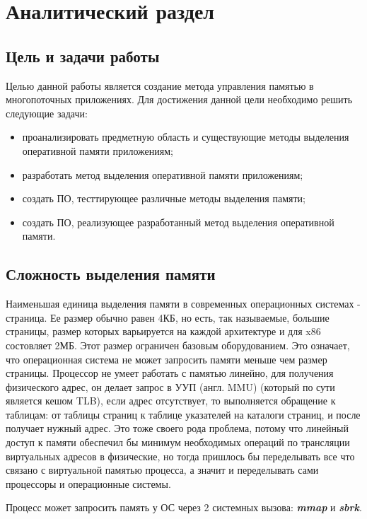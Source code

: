 \chapter{Аналитический раздел}
\label{cha:analysis}
\section{Цель и задачи работы}
Целью данной работы является создание метода управления памятью в многопоточных приложениях.
Для достижения данной цели необходимо решить следующие задачи:
\begin{itemize}
	\item проанализировать предметную область и существующие методы выделения оперативной памяти приложениям;
	\item разработать метод выделения оперативной памяти приложениям;
	\item создать ПО, тесттирующее различные методы выделения памяти;
	\item создать ПО, реализующее  разработанный метод выделения оперативной памяти.
\end{itemize}

\section{Сложность выделения памяти}

Наименьшая единица выделения памяти в современных операционных системах - страница. Ее размер обычно равен 4КБ, но есть, так называемые, большие   страницы, размер которых варьируется на каждой архитектуре и для x86 состовляет 2МБ. Этот размер ограничен базовым оборудованием. Это означает, что операционная   система не может запросить памяти меньше чем размер страницы. Процессор не умеет работать с памятью   линейно, для получения физического адрес, он делает запрос в УУП (англ. MMU)   (который   по   сути является кешом TLB), если адрес отсутствует, то выполняется обращение к таблицам: от таблицы страниц к таблице указателей на каталоги страниц, и после получает нужный адрес. Это тоже своего рода проблема, потому что линейный доступ к памяти обеспечил бы минимум необходимых операций по трансляции виртуальных адресов в физические, но тогда пришлось бы переделывать все что связано с виртуальной памятью   процесса, а значит и переделывать сами процессоры и операционные системы.

Процесс может запросить память у ОС через 2 системных вызова: \textbf{\textit{mmap}} и \textbf{\textit{sbrk}}.

